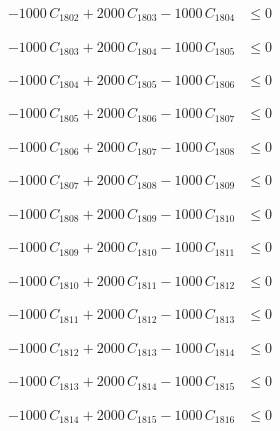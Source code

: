 \documentclass[a4paper,11pt]{article}
\begin{document}
\begin{align}
-1000\,C_{1802} + 2000\,C_{1803} - 1000\,C_{1804} &\leq 0 \nonumber
\end{align}

\begin{align}
-1000\,C_{1803} + 2000\,C_{1804} - 1000\,C_{1805} &\leq 0 \nonumber
\end{align}

\begin{align}
-1000\,C_{1804} + 2000\,C_{1805} - 1000\,C_{1806} &\leq 0 \nonumber
\end{align}

\begin{align}
-1000\,C_{1805} + 2000\,C_{1806} - 1000\,C_{1807} &\leq 0 \nonumber
\end{align}

\begin{align}
-1000\,C_{1806} + 2000\,C_{1807} - 1000\,C_{1808} &\leq 0 \nonumber
\end{align}

\begin{align}
-1000\,C_{1807} + 2000\,C_{1808} - 1000\,C_{1809} &\leq 0 \nonumber
\end{align}

\begin{align}
-1000\,C_{1808} + 2000\,C_{1809} - 1000\,C_{1810} &\leq 0 \nonumber
\end{align}

\begin{align}
-1000\,C_{1809} + 2000\,C_{1810} - 1000\,C_{1811} &\leq 0 \nonumber
\end{align}

\begin{align}
-1000\,C_{1810} + 2000\,C_{1811} - 1000\,C_{1812} &\leq 0 \nonumber
\end{align}

\begin{align}
-1000\,C_{1811} + 2000\,C_{1812} - 1000\,C_{1813} &\leq 0 \nonumber
\end{align}

\begin{align}
-1000\,C_{1812} + 2000\,C_{1813} - 1000\,C_{1814} &\leq 0 \nonumber
\end{align}

\begin{align}
-1000\,C_{1813} + 2000\,C_{1814} - 1000\,C_{1815} &\leq 0 \nonumber
\end{align}

\begin{align}
-1000\,C_{1814} + 2000\,C_{1815} - 1000\,C_{1816} &\leq 0 \nonumber
\end{align}
\end{document}
